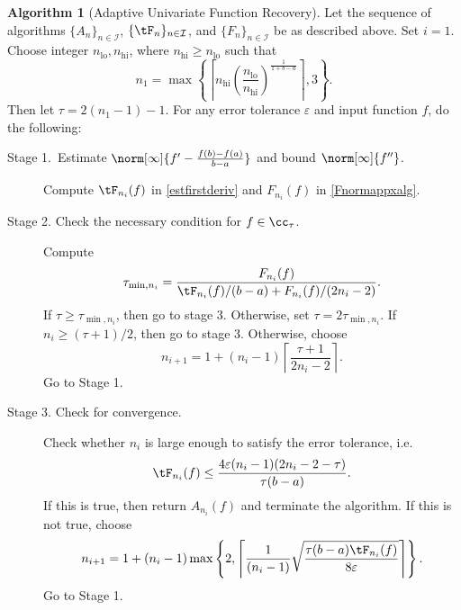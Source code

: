 \documentclass[]{elsarticle}
\DeclareMathOperator{\lo}{lo}
\theoremstyle{definition}
\newtheorem{algo}{Algorithm}
\theoremstyle{remark}
\begin{document}
\begin{algo}[Adaptive Univariate Function Recovery] \label{multistageapproalgo}
Let the sequence of algorithms $\{A_n\}_{n\in \mathcal{I}}$, $\{\tF_n\}_{n\in \mathcal{I}}$, and $\{F_n\}_{n\in \mathcal{I}}$ be as described above. Set $i=1$.
Choose integer $n_{\lo}, n_{\text{hi}}$, where $n_{\text{hi}} \ge n_{\lo}$ such that
$$n_1 = \max\left\{ \left\lceil n_{\text{hi}} \left(\frac{n_{\lo}}{n_{\text{hi}}}\right)^{\frac{1}{1+b-a}} \right\rceil ,3\right\}.$$
Then let $\tau = 2(n_1-1)-1.$ For any error tolerance $\varepsilon$ and input function $f$, do the following:
\begin{description}
\item[Stage 1.\ Estimate {$\norm[\infty]{f'-\frac{f(b)-f(a)}{b-a}}$} and bound {$\norm[\infty]{f''}$}.] Compute $\tF_{n_i}(f)$ in \eqref{estfirstderiv} and $F_{n_i}(f)$ in \eqref{Fnormappxalg}.

\item[Stage 2. Check the necessary condition for $f \in \cc_{\tau}$.] Compute
    \begin{align*}
     \tau_{\min,n_i} =  \frac{F_{n_i}(f)}{\tF_{n_i}(f)/(b-a)+F_{n_i}(f)/(2n_i-2)}.
    \end{align*}
If $\tau \ge \tau_{\min,n_i}$, then go to stage 3.  Otherwise, set $\tau = 2\tau_{\min,n_i}$.  If $n_i \ge (\tau+1)/2$, then go to stage 3.  Otherwise, choose
$$
n_{i+1}=1+ (n_i-1)\left\lceil\frac{\tau+1}{2n_i-2}\right\rceil.
$$
Go to Stage 1.

\item[Stage 3. Check for convergence.] Check whether $n_i$ is large enough to satisfy the error tolerance, i.e.
    \begin{equation*}
     \tF_{n_i}(f) \le \frac{4\varepsilon(n_i-1)(2n_i-2 - \tau)}{\tau(b-a)}.
    \end{equation*}
If this is true, then return $A_{n_i}(f)$ and terminate the algorithm.   If this is not true, choose
$$
n_{i+1}=1+ (n_i-1)\max\left\{2,\left\lceil\frac{1}{(n_i-1)}\sqrt{\frac{\tau (b-a) \tF_{n_i}(f)}{8\varepsilon}}\right\rceil\right\}.
$$
Go to Stage 1.
\end{description}
\end{algo}
\end{document}
